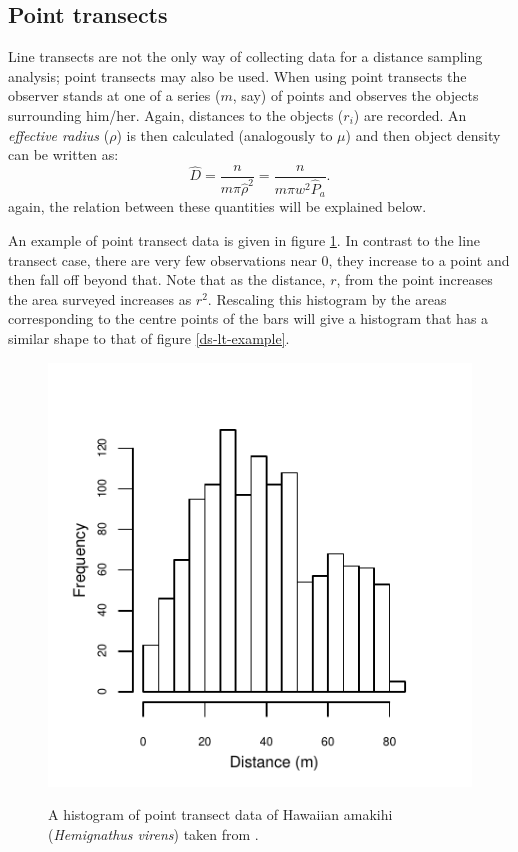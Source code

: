 \subsection{Point transects}
Line transects are not the only way of collecting data for a distance sampling analysis; point transects may also be used. When using point transects the observer stands at one of a series ($m$, say) of points and observes the objects surrounding him/her. Again, distances to the objects ($r_i$) are recorded. An \textit{effective radius} ($\rho$) is then calculated (analogously to $\mu$) and then object density can be written as:
\begin{equation*}
\hat{D}=\frac{n}{m \pi \hat{\rho}^2}=\frac{n}{m\pi w^2\hat{P}_a}.
\end{equation*}
again, the relation between these quantities will be explained below.

An example of point transect data is given in figure \ref{ds-pt-example}. In contrast to the line transect case, there are very few observations near 0, they increase to a point and then fall off beyond that. Note that as the distance, $r$, from the point increases the area surveyed increases as $r^2$. Rescaling this histogram by the areas corresponding to the centre points of the bars will give a histogram that has a similar shape to that of figure \ref{ds-lt-example}.

\begin{figure}
\centering
\includegraphics{intro/figs/pt-data-example.pdf}\\
\caption{A histogram of point transect data of Hawaiian amakihi (\textit{Hemignathus virens}) taken from .}
\label{ds-pt-example}
\end{figure}


